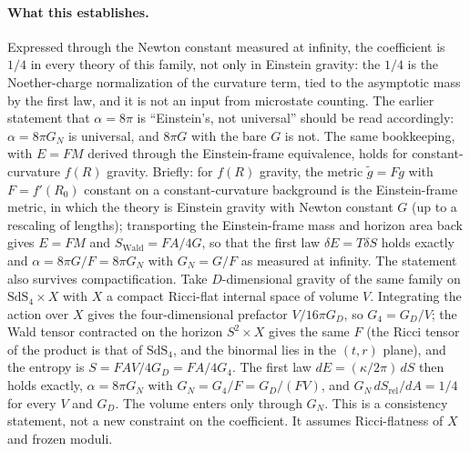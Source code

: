 \documentclass[11pt]{article}
\begin{document}
\paragraph{What this establishes.} Expressed through the Newton constant measured at infinity, the coefficient is $1/4$ in every theory of this family, not only in Einstein gravity: the $1/4$ is the Noether-charge normalization of the curvature term, tied to the asymptotic mass by the first law, and it is not an input from microstate counting. The earlier statement that $\alpha=8\pi$ is ``Einstein's, not universal'' should be read accordingly: $\alpha=8\pi G_N$ is universal, and $8\pi G$ with the bare $G$ is not. The same bookkeeping, with $E=F M$ derived through the Einstein-frame equivalence, holds for constant-curvature $f(R)$ gravity. Briefly: for $f(R)$ gravity, the metric $\tilde g=F g$ with $F=f'(R_0)$ constant on a constant-curvature background is the Einstein-frame metric, in which the theory is Einstein gravity with Newton constant $G$ (up to a rescaling of lengths); transporting the Einstein-frame mass and horizon area back gives $E=FM$ and $S_{\mathrm{Wald}}=FA/4G$, so that the first law $\delta E=T\delta S$ holds exactly and $\alpha=8\pi G/F=8\pi G_N$ with $G_N=G/F$ as measured at infinity. The statement also survives compactification. Take $D$-dimensional gravity of the same family on $\mathrm{SdS}_4\times X$ with $X$ a compact Ricci-flat internal space of volume $V$. Integrating the action over $X$ gives the four-dimensional prefactor $V/16\pi G_D$, so $G_4=G_D/V$; the Wald tensor contracted on the horizon $S^2\times X$ gives the same $F$ (the Ricci tensor of the product is that of $\mathrm{SdS}_4$, and the binormal lies in the $(t,r)$ plane), and the entropy is $S=FAV/4G_D=FA/4G_4$. The first law $dE=(\kappa/2\pi)\,dS$ then holds exactly, $\alpha=8\pi G_N$ with $G_N=G_4/F=G_D/(FV)$, and $G_N\,dS_{\mathrm{rel}}/dA=1/4$ for every $V$ and $G_D$. The volume enters only through $G_N$. This is a consistency statement, not a new constraint on the coefficient. It assumes Ricci-flatness of $X$ and frozen moduli.
\end{document}
